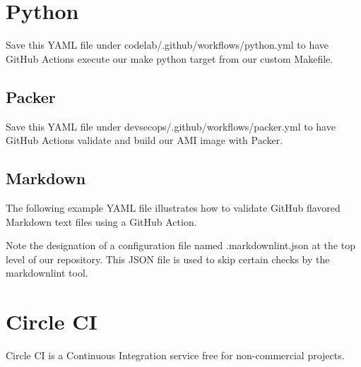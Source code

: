 %	


\section{Python}
\justify{}
Save this YAML file under codelab/.github/workflows/python.yml to have
GitHub Actions execute our make python target from our custom Makefile.

%	

\subsection{Packer}
\justify{}
Save this YAML file under devsecops/.github/workflows/packer.yml to have
GitHub Actions validate and build our AMI image with Packer.

%	

\subsection{Markdown}
\justify{}
The following example YAML file illustrates how to validate GitHub
flavored Markdown text files using a GitHub Action.

%	

\justify{}
Note the designation of a configuration file named .markdownlint.json at
the top level of our repository. This JSON file is used to skip certain
checks by the markdownlint tool.

\justify{}
%	

\section{Circle CI}
\justify{}
Circle CI is a Continuous Integration service free for non-commercial
projects.

